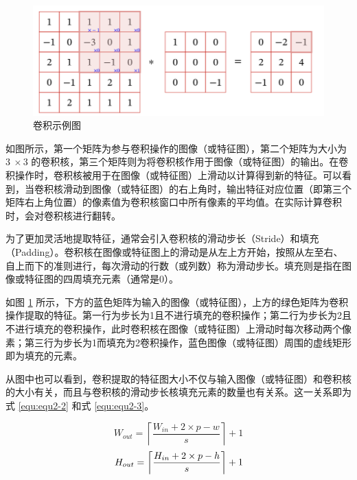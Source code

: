 \newpage

\begin{figure}[!htbp]
	\centering
	\includegraphics{figures/2.png}
	\caption{卷积示例图}
	\label{fig:fig2-1}
\end{figure}

如图所示，第一个矩阵为参与卷积操作的图像（或特征图），第二个矩阵为大小为 $3\ \times3$ 的卷积核，第三个矩阵则为将卷积核作用于图像（或特征图）的输出。在卷积操作时，卷积核被用于在图像（或特征图）上滑动以计算得到新的特征。可以看到，当卷积核滑动到图像（或特征图）的右上角时，输出特征对应位置（即第三个矩阵右上角位置）的像素值为卷积核窗口中所有像素的平均值。在实际计算卷积时，会对卷积核进行翻转。

为了更加灵活地提取特征，通常会引入卷积核的滑动步长（Stride）和填充（Padding）。卷积核在图像或特征图上的滑动是从左上方开始，按照从左至右、自上而下的准则进行，每次滑动的行数（或列数）称为滑动步长。填充则是指在图像或特征图的四周填充元素（通常是0）。

如图 \ref{fig:fig2-1} 所示，下方的蓝色矩阵为输入的图像（或特征图），上方的绿色矩阵为卷积操作提取的特征。第一行为步长为1且不进行填充的卷积操作；第二行为步长为2且不进行填充的卷积操作，此时卷积核在图像（或特征图）上滑动时每次移动两个像素；第三行为步长为1而填充为2卷积操作，蓝色图像（或特征图）周围的虚线矩形即为填充的元素。

从图中也可以看到，卷积提取的特征图大小不仅与输入图像（或特征图）和卷积核的大小有关，而且与卷积核的滑动步长核填充元素的数量也有关系。这一关系即为式 \ref{equ:equ2-2} 和式 \ref{equ:equ2-3}。

\begin{equation}
	W_{out}=\left\lceil\frac{W_{in}+2\times p-w}{s}\right\rceil+1
	\label{equ:equ2-2}
\end{equation}
\vspace{0.7cm}
\begin{equation}
	H_{out}=\left\lceil\frac{H_{in}+2\times p-h}{s}\right\rceil+1
	\label{equ:equ2-3}
	\vspace{0.3cm}
\end{equation}

